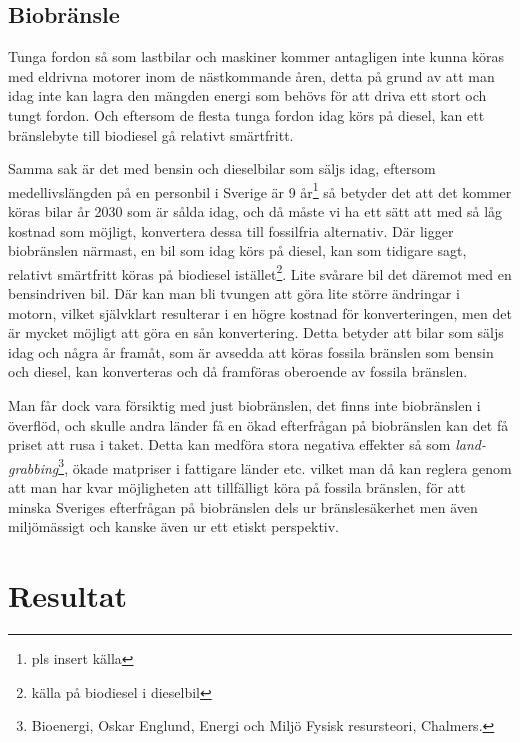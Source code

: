 \documentclass[a4paper,11pt,fleqn, titlepage]{article}
\begin{document}
\subsection{Biobränsle}
Tunga fordon så som lastbilar och maskiner kommer antagligen inte kunna
köras med eldrivna motorer inom de nästkommande åren, detta på grund av att
man idag inte kan lagra den mängden energi som behövs för att driva ett
stort och tungt fordon. Och eftersom de flesta tunga fordon idag körs på
diesel, kan ett bränslebyte till biodiesel gå relativt smärtfritt.

Samma sak är det med bensin och dieselbilar som säljs idag, eftersom
medellivslängden på en personbil i Sverige är 9 år\footnote{pls insert
källa} så betyder det att det kommer köras bilar år 2030 som är sålda idag,
och då måste vi ha ett sätt att med så låg kostnad som möjligt, konvertera
dessa till fossilfria alternativ. Där ligger biobränslen närmast, en bil
som idag körs på diesel, kan som tidigare sagt, relativt smärtfritt köras
på biodiesel istället\footnote{källa på biodiesel i dieselbil}. Lite
svårare bil det däremot med en bensindriven bil. Där kan man bli tvungen
att göra lite större ändringar i motorn, vilket självklart resulterar i en
högre kostnad för konverteringen, men det är mycket möjligt att göra en sån
konvertering. Detta betyder att bilar som säljs idag och några år framåt,
som är avsedda att köras fossila bränslen som bensin och diesel, kan
konverteras och då framföras oberoende av fossila bränslen.

Man får dock vara försiktig med just biobränslen, det finns inte
biobränslen i överflöd, och skulle andra länder få en ökad efterfrågan på
biobränslen kan det få priset att rusa i taket. Detta kan medföra stora
negativa effekter så som \emph{land-grabbing}\footnote{Bioenergi, Oskar
Englund, Energi och Miljö Fysisk resursteori, Chalmers.}, ökade matpriser i
fattigare länder etc. vilket man då kan reglera genom att man har kvar
möjligheten att tillfälligt köra på fossila bränslen, för att minska
Sveriges efterfrågan på biobränslen dels ur bränslesäkerhet men även
miljömässigt och kanske även ur ett etiskt perspektiv.

\section{Resultat}
\end{document}
